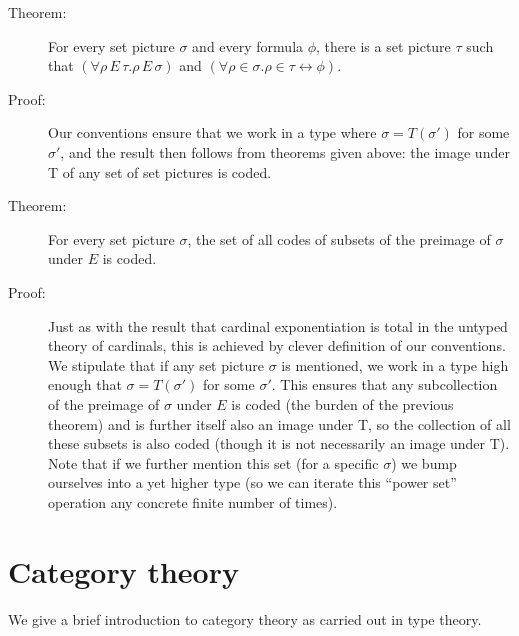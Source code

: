 \documentclass[12pt]{book}
\begin{document}
\begin{description}

\item[Theorem:] For every set picture $\sigma$ and every formula
$\phi$, there is a set picture $\tau$ such that $(\forall
\rho\,E\,\tau.\rho\,E\,\sigma)$ and $(\forall \rho \in \sigma.\rho \in
\tau \leftrightarrow \phi)$.  

\item[Proof:] Our conventions ensure that we work in a type where
$\sigma=T(\sigma')$ for some $\sigma'$, and the result then follows
from theorems given above: the image under T of any set of set
pictures is coded.

\item[Theorem:] For every set picture $\sigma$, the set of all codes
of subsets of the preimage of $\sigma$ under $E$ is coded.

\item[Proof:] Just as with the result that cardinal exponentiation is
total in the untyped theory of cardinals, this is achieved by clever
definition of our conventions.  We stipulate that if any set picture
$\sigma$ is mentioned, we work in a type high enough that
$\sigma=T(\sigma')$ for some $\sigma'$.  This ensures that any
subcollection of the preimage of $\sigma$ under $E$ is coded (the
burden of the previous theorem) and is further itself also an image
under T, so the collection of all these subsets is also coded (though
it is not necessarily an image under T).  Note that if we further
mention this set (for a specific $\sigma$) we bump ourselves into a
yet higher type (so we can iterate this ``power set'' operation
any concrete finite number of times).

\end{description}

\newpage

\section{Category theory}

We give a brief introduction to category theory as carried out in type theory.
\end{document}
